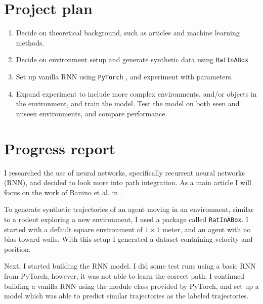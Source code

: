 \section{Project plan}\label{sec:project_plan}
\begin{enumerate}
    \item Decide on theoretical background, such as articles and machine learning methods.
    \item Decide on environment setup and generate synthetic data using \verb|RatInABox| \cite{george:2022:ratinabox}
    \item Set up vanilla RNN using \verb|PyTorch| \cite{2017:pytorch}, and experiment with parameters.
    \item Expand experiment to include more complex environments, and/or objects in the environment, and train the model. Test the model on both seen and unseen environments, and compare performance.
\end{enumerate}


\section{Progress report}\label{sec:progress_report}
I researched the use of neural networks, specifically recurrent neural networks (RNN), and decided to look more into path integration. As a main article I will focus on the work of Banino et al. in \cite{banino:2018:vector_based}.

To generate synthetic trajectories of an agent moving in an environment, similar to a rodent exploring a new environment, I used a package called \verb|RatInABox|. I started with a default square environment of $1 \times 1$ meter, and an agent with no bias toward walls. With this setup I generated a dataset containing velocity and position.

Next, I started building the RNN model. I did some test runs using a basic RNN from PyTorch, however, it was not able to learn the correct path. I continued building a vanilla RNN using the module class provided by PyTorch, and set up a model which was able to predict similar trajectories as the labeled trajectories. 

